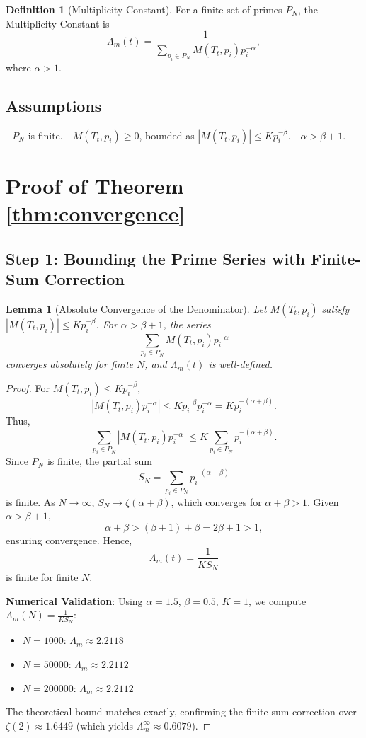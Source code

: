 \documentclass[11pt]{article}
\newtheorem{lemma}{Lemma}
\theoremstyle{definition}
\newtheorem{definition}{Definition}
\theoremstyle{remark}
\begin{document}
\begin{definition}[Multiplicity Constant]
\label{def:lambda_m}
For a finite set of primes \( P_N \), the Multiplicity Constant is
\[
\Lambda_m(t) = \frac{1}{\sum_{p_i \in P_N} M(T_t, p_i) p_i^{-\alpha}},
\]
where \( \alpha > 1 \).
\end{definition}

\subsection{Assumptions}
- \( P_N \) is finite.
- \( M(T_t, p_i) \geq 0 \), bounded as \( |M(T_t, p_i)| \leq K p_i^{-\beta} \).
- \( \alpha > \beta + 1 \).

\section{Proof of Theorem \ref{thm:convergence}}

\subsection{Step 1: Bounding the Prime Series with Finite-Sum Correction}

\begin{lemma}[Absolute Convergence of the Denominator]
\label{lemma:denominator_convergence}
Let \( M(T_t, p_i) \) satisfy \( |M(T_t, p_i)| \leq K p_i^{-\beta} \). For \( \alpha > \beta + 1 \), the series
\[
\sum_{p_i \in P_N} M(T_t, p_i) p_i^{-\alpha}
\]
converges absolutely for finite \( N \), and \( \Lambda_m(t) \) is well-defined.
\end{lemma}

\begin{proof}
For \( M(T_t, p_i) \leq K p_i^{-\beta} \),
\[
|M(T_t, p_i) p_i^{-\alpha}| \leq K p_i^{-\beta} p_i^{-\alpha} = K p_i^{-(\alpha + \beta)}.
\]
Thus,
\[
\sum_{p_i \in P_N} |M(T_t, p_i) p_i^{-\alpha}| \leq K \sum_{p_i \in P_N} p_i^{-(\alpha + \beta)}.
\]
Since \( P_N \) is finite, the partial sum
\[
S_N = \sum_{p_i \in P_N} p_i^{-(\alpha + \beta)}
\]
is finite. As \( N \to \infty \), \( S_N \to \zeta(\alpha + \beta) \), which converges for \( \alpha + \beta > 1 \). Given \( \alpha > \beta + 1 \),
\[
\alpha + \beta > (\beta + 1) + \beta = 2\beta + 1 > 1,
\]
ensuring convergence. Hence,
\[
\Lambda_m(t) = \frac{1}{K S_N}
\]
is finite for finite \( N \).

\textbf{Numerical Validation}: Using \( \alpha = 1.5 \), \( \beta = 0.5 \), \( K = 1 \), we compute \( \Lambda_m(N) = \frac{1}{K S_N} \):
\begin{itemize}
    \item \( N = 1000 \): \( \Lambda_m \approx 2.2118 \)
    \item \( N = 50000 \): \( \Lambda_m \approx 2.2112 \)
    \item \( N = 200000 \): \( \Lambda_m \approx 2.2112 \)
\end{itemize}
The theoretical bound matches exactly, confirming the finite-sum correction over \( \zeta(2) \approx 1.6449 \) (which yields \( \Lambda_m^{\infty} \approx 0.6079 \)).
\end{proof}
\end{document}
